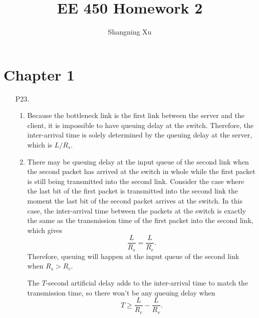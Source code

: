 \documentclass{article}
\title{EE 450 Homework 2}
\author{Shangning Xu}
\begin{document}
\maketitle

\section*{Chapter 1}

\begin{enumerate}
    \item[P23.] \begin{enumerate}
        \item Because the bottleneck link is the first link between the server and the client, it is impossible to have queuing delay at the switch. Therefore, the inter-arrival time is solely determined by the queuing delay at the server, which is $L/R_s$.
        \item There may be queuing delay at the input queue of the second link when the second packet has arrived at the switch in whole while the first packet is still being transmitted into the second link. Consider the case where the last bit of the first packet is transmitted into the second link the moment the last bit of the second packet arrives at the switch. In this case, the inter-arrival time between the packets at the switch is exactly the same as the transmission time of the first packet into the second link, which gives
        \[
            \frac{L}{R_s} = \frac{L}{R_c}.
        \]
        Therefore, queuing will happen at the input queue of the second link when $R_s > R_c$.

        The $T$-second artificial delay adds to the inter-arrival time to match the transmission time, so there won't be any queuing delay when
        \[
            T \ge \frac{L}{R_c} - \frac{L}{R_s}.
        \]
    \end{enumerate}


\end{enumerate}
\end{document}
